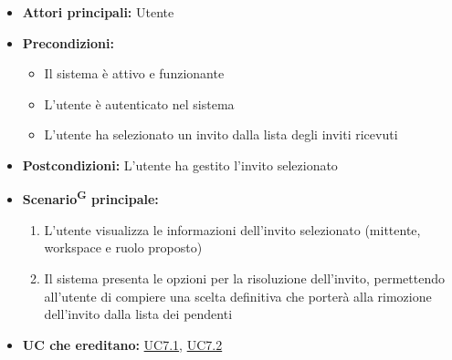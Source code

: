 \documentclass[a4paper, 11pt]{article}
\begin{document}
\begin{itemize}
	\item \textbf{Attori principali:} Utente
	\item \textbf{Precondizioni:}
	\begin{itemize}
		\item Il sistema è attivo e funzionante
		\item L'utente è autenticato nel sistema
        \item L'utente ha selezionato un invito dalla lista degli inviti ricevuti
	\end{itemize}
    \item \textbf{Postcondizioni:} L'utente ha gestito l'invito selezionato
	\item \textbf{Scenario\textsuperscript{G} principale:}
    \begin{enumerate}
        \item L'utente visualizza le informazioni dell'invito selezionato (mittente, workspace e ruolo proposto)
        \item Il sistema presenta le opzioni per la risoluzione dell'invito, permettendo all'utente di compiere una scelta definitiva che porterà alla rimozione dell'invito dalla lista dei pendenti
    \end{enumerate}
    \item \textbf{UC che ereditano:} \hyperref[UC7.1]{UC7.1}, \hyperref[UC7.2]{UC7.2}
\end{itemize}
\end{document}
